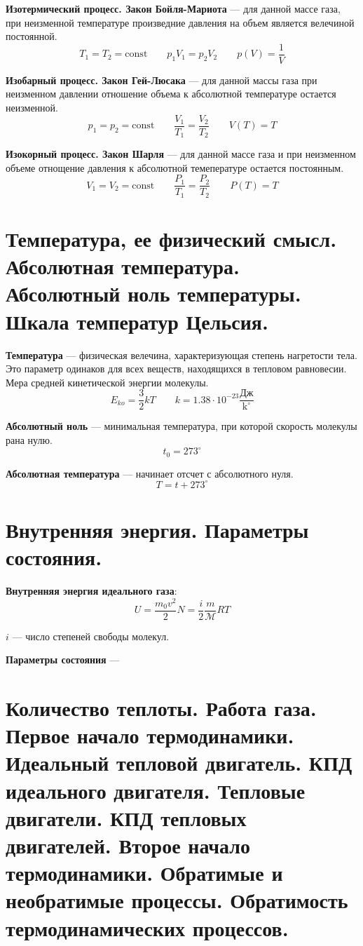 \documentclass{report}
\begin{document}
{\bf Изотермический процесс. Закон Бойля-Мариота} ---
для данной массе газа, при неизменной температуре произведние давления на 
объем является велечиной постоянной.
$$
T_1=T_2=\textrm{const} \qquad 
p_1V_1=p_2V_2 \qquad 
p(V)=\frac{1}{V}
$$

{\bf Изобарный процесс. Закон Гей-Люсака} ---
для данной массы газа при неизменном давлении отношение объема к абсолютной 
температуре остается неизменной.
$$
p_1=p_2=\textrm{const} \qquad 
\frac{V_1}{T_1}=\frac{V_2}{T_2} \qquad
V(T) = T
$$

{\bf Изокорный процесс. Закон Шарля} ---
для данной массе газа и при неизменном объеме отнощение давления к абсолютной темепературе
остается постоянным.
$$
V_1=V_2=\textrm{const} \qquad 
\frac{P_1}{T_1}=\frac{P_2}{T_2} \qquad
P(T) = T
$$



\part{Температура, ее физический смысл. 
Абсолютная температура. 
Абсолютный ноль температуры. 
Шкала температур Цельсия.}

{\bf Температура} ---
физическая велечина, характеризующая степень нагретости тела. Это параметр одинаков для всех 
веществ, находящихся в тепловом равновесии. Мера средней кинетической энергии молекулы.
$$
E_{ko}=\frac{3}{2}kT \qquad k=1.38\cdot 10^{-23}\frac{\textrm{Дж}}{\textrm{k}^\circ}
$$

{\bf Абсолютный ноль} ---
минимальная температура, при которой скорость молекулы рана нулю.
$$
t_0=273^\circ
$$

{\bf Абсолютная температура} ---
начинает отсчет с абсолютного нуля.
$$
T=t+273^\circ
$$



\part{Внутренняя энергия. 
Параметры состояния.}

{\bf Внутренняя энергия идеального газа}:
$$
U=\frac{m_0v^2}{2}N=\frac{i}{2}\frac{m}{\mathcal{M}}RT
$$

$i$ --- число степеней свободы молекул.

{\bf Параметры состояния} ---



\part{Количество теплоты. 
Работа газа. 
Первое начало термодинамики.
Идеальный тепловой двигатель. 
КПД идеального двигателя. 
Тепловые двигатели. 
КПД тепловых двигателей. 
Второе начало термодинамики. 
Обратимые и необратимые процессы. 
Обратимость термодинамических процессов.}
\end{document}

